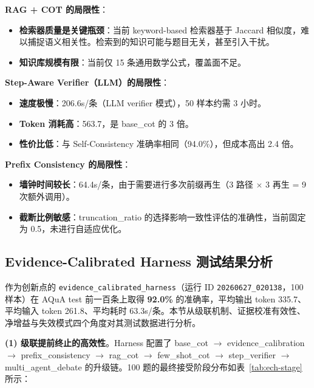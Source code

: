 \documentclass[lang=cn,a4paper,newtx]{elegantpaper}
\begin{document}
\textbf{RAG + COT 的局限性}：

\begin{itemize}
  \item \textbf{检索器质量是关键瓶颈}：当前 keyword-based 检索器基于 Jaccard 相似度，难以捕捉语义相关性。检索到的知识可能与题目无关，甚至引入干扰。
  \item \textbf{知识库规模有限}：当前仅 15 条通用数学公式，覆盖面不足。
\end{itemize}

\textbf{Step-Aware Verifier（LLM）的局限性}：

\begin{itemize}
  \item \textbf{速度极慢}：206.6s/条（LLM verifier 模式），50 样本约需 3 小时。
  \item \textbf{Token 消耗高}：563.7，是 base\_cot 的 3 倍。
  \item \textbf{性价比低}：与 Self-Consistency 准确率相同（94.0\%），但成本高出 2.4 倍。
\end{itemize}

\textbf{Prefix Consistency 的局限性}：

\begin{itemize}
  \item \textbf{墙钟时间较长}：64.4s/条，由于需要进行多次前缀再生（3 路径 $\times$ 3 再生 = 9 次额外调用）。
  \item \textbf{截断比例敏感}：truncation\_ratio 的选择影响一致性评估的准确性，当前固定为 0.5，未进行自适应优化。
\end{itemize}

\subsection{Evidence-Calibrated Harness 测试结果分析}
\label{sec:evidence-harness-results}

作为创新点的 \texttt{evidence\_calibrated\_harness}（运行 ID \texttt{20260627\_020138}，100 样本）在 AQuA test 前一百条上取得 \textbf{92.0\%} 的准确率，平均输出 token 335.7、平均输入 token 261.8、平均耗时 63.3s/条。本节从级联机制、证据校准有效性、净增益与失效模式四个角度对其测试数据进行分析。

\textbf{(1) 级联提前终止的高效性}。Harness 配置了 base\_cot $\to$ evidence\_calibration $\to$ prefix\_consistency $\to$ rag\_cot $\to$ few\_shot\_cot $\to$ step\_verifier $\to$ multi\_agent\_debate 的升级链。100 题的最终接受阶段分布如表~\ref{tab:ech-stage} 所示：
\end{document}
